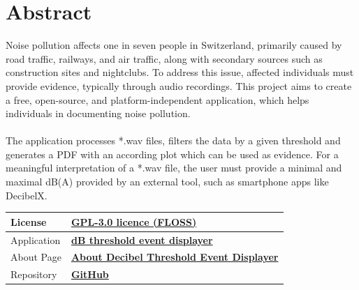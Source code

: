 \section{Abstract}\label{sec:abstract}

Noise pollution affects one in seven people in Switzerland, 
primarily caused by road traffic, railways, and air traffic, along with secondary sources such as construction sites and nightclubs. 
To address this issue, affected individuals must provide evidence, typically through audio recordings.
This project aims to create a free, open-source, and platform-independent application, which helps individuals in documenting noise pollution. \\
\\
The application processes *.wav files, filters the data by a given threshold and
generates a PDF with an according plot which can be used as evidence.
For a meaningful interpretation of a *.wav file, the user must provide a minimal and maximal dB(A) provided by an external tool,
such as smartphone apps like DecibelX. \\

\begin{table}[H]
    \centering
    \begin{tabularx}{\textwidth}{l X}
        \toprule
        License           & \textbf{\href{https://www.gnu.org/licenses/gpl-3.0.en.html}{GPL-3.0 licence (FLOSS)}} \\
        \midrule
        Application       & \textbf{\href{https://decibel-threshold-event-displayer.github.io/\#/}{dB threshold event displayer}} \\
        \midrule
        About Page        & \textbf{\href{https://decibel-threshold-event-displayer.github.io/\#/about}{About Decibel Threshold Event Displayer}} \\
        \midrule
        Repository        & \textbf{\href{https://github.com/decibel-threshold-event-displayer/decibel-threshold-event-displayer.github.io}{GitHub}} \\
        \bottomrule
    \end{tabularx}
    \label{tab:abstract-infos}
\end{table}

~\\

